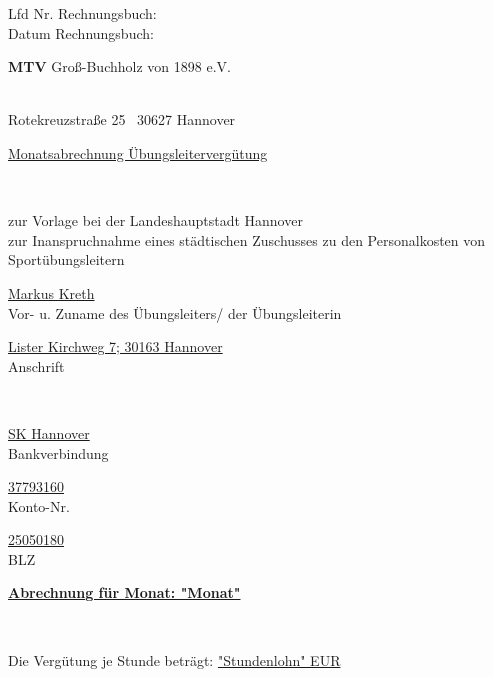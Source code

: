 \documentclass[a4paper,10pt,BCOR=0mm]{scrreprt}
\begin{document}
\begin{flushright}
\parbox{6cm}{Lfd Nr. Rechnungsbuch: \hrulefill \\
Datum Rechnungsbuch: \hrulefill }
\end{flushright}
\begin{center}
\begin{Large}\textbf{MTV} Groß-Buchholz von 1898 e.V.                                        \end{Large}\\
Rotekreuzstraße 25 \textperiodcentered\ 30627 Hannover\\[.4cm]
\begin{huge}\underline{Monatsabrechnung Übungsleitervergütung}\end{huge}\\
\begin{scriptsize}zur Vorlage bei der Landeshauptstadt Hannover\\
zur Inanspruchnahme eines städtischen Zuschusses zu den Personalkosten von Sportübungsleitern\\[.7cm]
\end{scriptsize}

\parbox{0,49\textwidth}{
\begin{center}
\hrulefill\underline{Markus Kreth}\hrulefill\\
Vor- u. Zuname des Übungsleiters/ der Übungsleiterin
\end{center}
}
\hfill
\parbox{0,49\textwidth}{\begin{center}
\hrulefill\underline{Lister Kirchweg 7; 30163 Hannover}\hrulefill\\
Anschrift\end{center}}\\[.7cm]
\parbox{0,32\textwidth}{
\begin{center}
\hrulefill\underline{SK Hannover}\hrulefill\\
Bankverbindung
\end{center}
}
\hfill
\parbox{0,32\textwidth}{
\begin{center}
\hrulefill\underline{37793160}\hrulefill\\
Konto-Nr.
\end{center}
}
\hfill
\parbox{0,32\textwidth}{
\begin{center}
\hrulefill\underline{25050180}\hrulefill\\
BLZ
\end{center}
}
\parbox{12cm}{\begin{large}\underline{\textbf{Abrechnung für Monat: "Monat"}}\end{large}}\\
\parbox{9cm}{Die Vergütung je Stunde beträgt: \underline{"Stundenlohn" EUR}}
\end{center}\begin{flushright}


\end{flushright}
\end{document}
